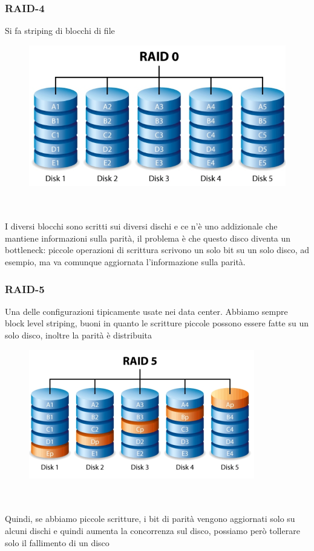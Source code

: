 \documentclass[12pt, oneside]{extbook} %
\begin{document}
\subsubsection{RAID-4}
Si fa striping di blocchi di file\\
\begin{figure}[!h]
	\includegraphics[scale=0.4]{immagini/raid0.png}
\end{figure}\\\\
I diversi blocchi sono scritti sui diversi dischi e ce n'è uno addizionale che mantiene informazioni sulla parità, il problema è che questo disco diventa un bottleneck: piccole operazioni di scrittura scrivono un solo bit su un solo disco, ad esempio, ma va comunque aggiornata l'informazione sulla parità.
\subsubsection{RAID-5}
Una delle configurazioni tipicamente usate nei data center. Abbiamo sempre block level striping, buoni in quanto le scritture piccole possono essere fatte su un solo disco, inoltre la parità è distribuita\\
\begin{figure}[!h]
	\includegraphics[scale=0.4]{immagini/raid5.png}
\end{figure}\\\\
Quindi, se abbiamo piccole scritture, i bit di parità vengono aggiornati solo su alcuni dischi e quindi aumenta la concorrenza sul disco, possiamo però tollerare solo il fallimento di un disco
\end{document}
